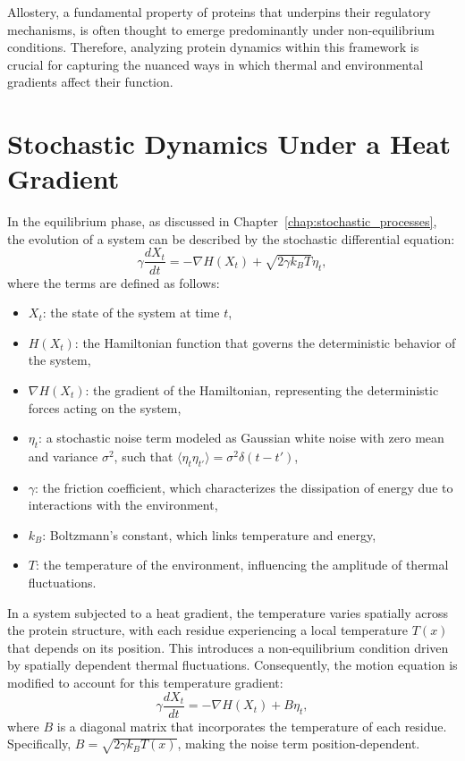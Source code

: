 \documentclass[English, Lau, oneside]{sapthesis}
\begin{document}
Allostery, a fundamental property of proteins that underpins their regulatory mechanisms, is often thought to emerge predominantly under non-equilibrium conditions. Therefore, analyzing protein dynamics within this framework is crucial for capturing the nuanced ways in which thermal and environmental gradients affect their function.
\newpage
\section{Stochastic Dynamics Under a Heat Gradient}

In the equilibrium phase, as discussed in Chapter~\ref{chap:stochastic_processes}, the evolution of a system can be described by the stochastic differential equation:
\begin{equation}
    \gamma \frac{dX_t}{dt} = -\nabla H(X_t) + \sqrt{2 \gamma k_B T} \eta_t,
\end{equation}
where the terms are defined as follows:
\begin{itemize}
    \item \( X_t \): the state of the system at time \( t \),
    \item \( H(X_t) \): the Hamiltonian function that governs the deterministic behavior of the system,
    \item \( \nabla H(X_t) \): the gradient of the Hamiltonian, representing the deterministic forces acting on the system,
    \item \( \eta_t \): a stochastic noise term modeled as Gaussian white noise with zero mean and variance \( \sigma^2 \), such that \( \langle \eta_t \eta_{t'} \rangle = \sigma^2 \delta(t-t') \),
    \item \( \gamma \): the friction coefficient, which characterizes the dissipation of energy due to interactions with the environment,
    \item \( k_B \): Boltzmann's constant, which links temperature and energy,
    \item \( T \): the temperature of the environment, influencing the amplitude of thermal fluctuations.
\end{itemize}

In a system subjected to a heat gradient, the temperature varies spatially across the protein structure, with each residue experiencing a local temperature \( T(x) \) that depends on its position. This introduces a non-equilibrium condition driven by spatially dependent thermal fluctuations. Consequently, the motion equation is modified to account for this temperature gradient:
\begin{equation}
    \gamma \frac{dX_t}{dt} = -\nabla H(X_t) + B \eta_t, \label{out_eq}
\end{equation}
where \( B \) is a diagonal matrix that incorporates the temperature of each residue. Specifically, \( B = \sqrt{2 \gamma k_B T(x)} \), making the noise term position-dependent.
\end{document}
